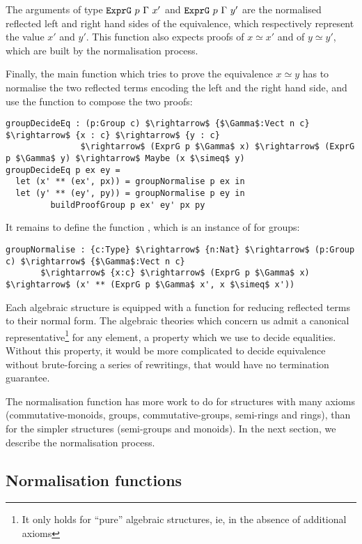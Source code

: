 The arguments of type $\code{ExprG}\ p\ \Gamma\ x'$ and $\code{ExprG}\ p\ \Gamma\ y'$ are the normalised reflected
left and right hand sides of the equivalence, which respectively represent the value $x'$ and $y'$. 
This function also expects proofs of $x \simeq x'$ and
of $y \simeq y'$, which are built by the normalisation process.

Finally, the main function which tries to prove the equivalence $x \simeq y$
has to normalise the two reflected terms encoding the left and the right hand
side, and use the function  to compose the two
proofs:

\begin{lstlisting}
groupDecideEq : (p:Group c) $\rightarrow$ {$\Gamma$:Vect n c} $\rightarrow$ {x : c} $\rightarrow$ {y : c} 
               $\rightarrow$ (ExprG p $\Gamma$ x) $\rightarrow$ (ExprG p $\Gamma$ y) $\rightarrow$ Maybe (x $\simeq$ y)
groupDecideEq p ex ey =
  let (x' ** (ex', px)) = groupNormalise p ex in
  let (y' ** (ey', py)) = groupNormalise p ey in
	     buildProofGroup p ex' ey' px py
\end{lstlisting}


It remains to define the function , which is an
instance of  for groups:

\begin{lstlisting}
groupNormalise : {c:Type} $\rightarrow$ {n:Nat} $\rightarrow$ (p:Group c) $\rightarrow$ {$\Gamma$:Vect n c} 
       $\rightarrow$ {x:c} $\rightarrow$ (ExprG p $\Gamma$ x) $\rightarrow$ (x' ** (ExprG p $\Gamma$ x', x $\simeq$ x'))
\end{lstlisting}

Each algebraic structure is equipped with a function for reducing reflected terms to their normal form.
The algebraic theories which concern us admit a canonical representative\footnote{It only holds for ``pure'' algebraic structures, ie, in the absence of additional axioms}  for
any element, a property which we use to decide equalities. Without this
property, it would be more complicated to decide equivalence without
brute-forcing a series of rewritings, that would have no termination guarantee.  

The normalisation function has more work to do for structures with many
axioms (commutative-monoids, groups, commutative-groups, semi-rings and rings),
than for the simpler structures (semi-groups and monoids). In the next
section, we describe the normalisation process.


\subsection{Normalisation functions}
\label{sect:normalFormShape}

